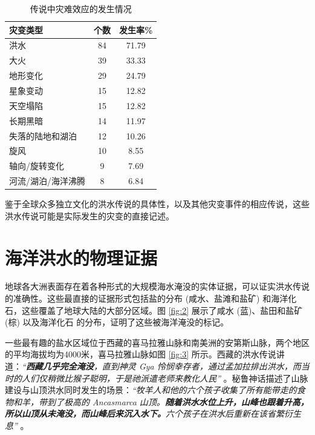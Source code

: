 \documentclass[10pt,twocolumn,letterpaper]{article}
\begin{document}
\begin{table}[ht]
\begin{center}
\renewcommand{\arraystretch}{1.2}  %
\begin{tabular}{|l|c|c|}
\hline
\textbf{灾变类型} & \textbf{个数} & \textbf{发生率\%} \\
\hline\hline
洪水               & 84 & 71.79 \\
大火               & 39 & 33.33 \\
地形变化           & 29 & 24.79 \\
星象变动           & 15 & 12.82 \\
天空塌陷           & 15 & 12.82 \\
长期黑暗           & 14 & 11.97 \\
失落的陆地和湖泊   & 12 & 10.26 \\
旋风               & 10 & 8.55  \\
轴向/旋转变化      & 9 & 7.69  \\
河流/湖泊/海洋沸腾 & 8 & 6.84 \\
\hline
\end{tabular}
\end{center}
\caption{传说中灾难效应的发生情况}
\label{tab: 1}
\end{table}

鉴于全球众多独立文化的洪水传说的具体性，以及其他灾变事件的相应传说，这些洪水传说可能是实际发生的灾变的直接记述。

\section{海洋洪水的物理证据}

地球各大洲表面存在着各种形式的大规模海水淹没的实体证据，可以证实洪水传说的准确性。这些最直接的证据形式包括盐的分布 (咸水、盐滩和盐矿) 和海洋化石，这些覆盖了地球大陆的大部分区域。图 \ref{fig:2} 展示了咸水 (蓝)、盐田和盐矿 (棕) 以及海洋化石 \cite{15,16,86,87} 的分布，证明了这些被海洋淹没的标记。

一些最有趣的盐水区域位于西藏的喜马拉雅山脉和南美洲的安第斯山脉，两个地区的平均海拔均为4000米，喜马拉雅山脉如图 \ref{fig:3} 所示。西藏的洪水传说讲道：\textit{“\textbf{西藏几乎完全淹没}，直到神灵 Gya 怜悯幸存者，通过孟加拉排出洪水，而当时的人们仅稍微比猴子聪明，于是祂派遣老师来教化人民”} \cite{3}。秘鲁神话描述了山脉建设与山顶洪水同时发生的场景：\textit{“牧羊人和他的六个孩子收集了所有能带走的食物和羊，带到了极高的 Ancasmarca 山顶。\textbf{随着洪水水位上升，山峰也跟着升高，所以山顶从未淹没，而山峰后来沉入水下。}六个孩子在洪水后重新在该省繁衍生息”} \cite{3}。
\end{document}
